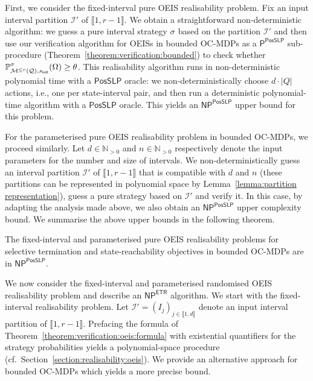 \documentclass[a4paper,UKenglish,cleveref,autoref,thm-restate,colorlinks]{lipics-v2021}
\newcommand{\init}{\mathsf{init}}
\newcommand{\integerInterval}[1]{\llbracket{}#1\rrbracket{}}
\newcommand{\ptime}{\textsf{P}}
\newcommand{\np}{\textsf{NP}}
\newcommand{\posSLP}{\textsf{PosSLP}}
\newcommand{\etr}{\textsf{ETR}}
\newcommand{\IN}{\mathbb{N}}
\newcommand{\INpos}{\IN_{>0}}
\newcommand{\mdp}{\mathcal{M}}
\newcommand{\ocmdp}{\mathcal{Q}}
\newcommand{\ocmdpFin}[2]{\mdp^{\leq #2}(#1)}
\newcommand{\ocStateSpace}{Q}
\newcommand{\ocConfig}{s}
\newcommand{\counterUB}{r}
\newcommand{\intPart}{\mathcal{I}}
\newcommand{\interval}{I}
\newcommand{\intNum}{d}
\newcommand{\intSize}{n}
\newcommand{\intIndex}{j}
\newcommand{\objective}{\Omega}
\newcommand{\thresProba}{\theta}
\newcommand{\stratGeneric}[1]{{\sigma_{#1}}}
\newcommand{\strat}{\stratGeneric{}}
\begin{document}
First, we consider the fixed-interval pure OEIS realisability problem.
Fix an input interval partition $\intPart'$ of $\integerInterval{1, \counterUB-1}$.
We obtain a straightforward non-deterministic algorithm: we guess a pure interval strategy $\strat$ based on the partition $\intPart'$ and then use our verification algorithm for OEISs in bounded OC-MDPs as a $\ptime^{\posSLP}$ sub-procedure (Theorem~\ref{theorem:verification:bounded}) to check whether $\probaGverb{\ocmdpFin{\ocmdp}{\counterUB}}{\ocConfig_\init}{\strat}(\objective)\geq\thresProba$.
This realisability algorithm runs in non-deterministic polynomial time with a $\posSLP$ oracle: we non-deterministically choose $\intNum\cdot|\ocStateSpace|$ actions, i.e., one per state-interval pair, and then run a deterministic polynomial-time algorithm with a $\posSLP$ oracle.
This yields an $\np^{\posSLP}$ upper bound for this problem.

For the parameterised pure OEIS realisability problem in bounded OC-MDPs, we proceed similarly.
Let $\intNum\in\INpos$ and $\intSize\in\INpos$ respectively denote the input parameters for the number and size of intervals.
We non-deterministically guess an interval partition $\intPart'$ of $\integerInterval{1, \counterUB-1}$ that is compatible with $\intNum$ and $\intSize$ (these partitions can be represented in polynomial space by Lemma~\ref{lemma:partition representation}), guess a pure strategy based on $\intPart'$ and verify it.
In this case, by adapting the analysis made above, we also obtain an $\np^{\posSLP}$ upper complexity bound.
We summarise the above upper bounds in the following theorem.

\begin{theorem}\label{theorem:realisability:bounded:pure}
  The fixed-interval and parameterised pure OEIS realisability problems for selective termination and state-reachability objectives in bounded OC-MDPs are in $\np^{\posSLP}$.
\end{theorem}

We now consider the fixed-interval and parameterised randomised OEIS realisability problem and describe an $\np^{\etr}$ algorithm.
We start with the fixed-interval realisability problem.
Let $\intPart' = (\interval_\intIndex)_{\intIndex\in\integerInterval{1, \intNum}}$ denote an input interval partition of $\integerInterval{1, \counterUB-1}$.
Prefacing the formula of Theorem~\ref{theorem:verification:oeis:formula} with existential quantifiers for the strategy probabilities yields a polynomial-space procedure (cf.~Section~\ref{section:realisability:oeis}).
We provide an alternative approach for bounded OC-MDPs which yields a more precise bound.
\end{document}
